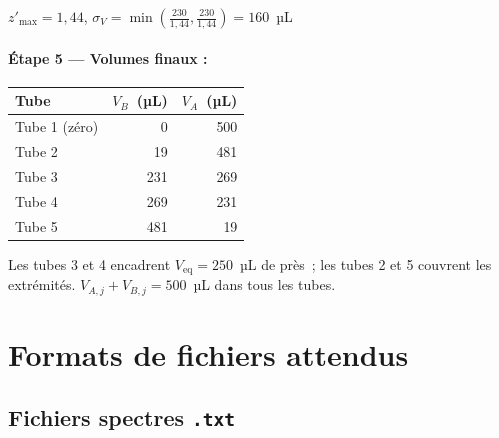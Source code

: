 \documentclass[12pt, a4paper]{article}
\begin{document}
\medskip
$z'_\text{max} = 1{,}44$, $\sigma_V = \min\!\left(\frac{230}{1{,}44}, \frac{230}{1{,}44}\right) = 160$~µL

\paragraph{Étape 5 — Volumes finaux :}

\begin{center}
\begin{tabular}{lrr}
\toprule
Tube & $V_B$~(µL) & $V_A$~(µL) \\
\midrule
Tube 1 (zéro)    &    0 & 500 \\
Tube 2            &   19 & 481 \\
Tube 3            &  231 & 269 \\
Tube 4            &  269 & 231 \\
Tube 5            &  481 &  19 \\
\bottomrule
\end{tabular}
\end{center}

Les tubes 3 et 4 encadrent $V_\text{eq} = 250$~µL de près~; les tubes 2 et 5
couvrent les extrémités. $V_{A,j} + V_{B,j} = 500$~µL dans tous les tubes.

\section{Formats de fichiers attendus}

\subsection{Fichiers spectres \texttt{.txt}}
\end{document}
